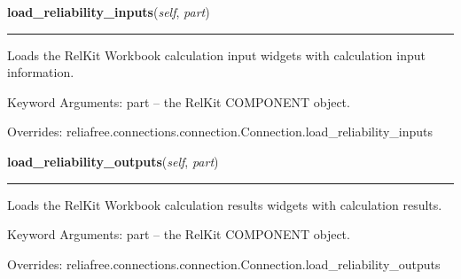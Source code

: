     \vspace{0.5ex}

\hspace{.8\funcindent}\begin{boxedminipage}{\funcwidth}

    \raggedright \textbf{load\_reliability\_inputs}(\textit{self}, \textit{part})

    \vspace{-1.5ex}

    \rule{\textwidth}{0.5\fboxrule}
\setlength{\parskip}{2ex}
    Loads the RelKit Workbook calculation input widgets with calculation
    input information.

    Keyword Arguments: part -- the RelKit COMPONENT object.

\setlength{\parskip}{1ex}
      Overrides: reliafree.connections.connection.Connection.load\_reliability\_inputs

    \end{boxedminipage}

    \vspace{0.5ex}

\hspace{.8\funcindent}\begin{boxedminipage}{\funcwidth}

    \raggedright \textbf{load\_reliability\_outputs}(\textit{self}, \textit{part})

    \vspace{-1.5ex}

    \rule{\textwidth}{0.5\fboxrule}
\setlength{\parskip}{2ex}
    Loads the RelKit Workbook calculation results widgets with 
    calculation results.

    Keyword Arguments: part -- the RelKit COMPONENT object.

\setlength{\parskip}{1ex}
      Overrides: reliafree.connections.connection.Connection.load\_reliability\_outputs

    \end{boxedminipage}

    \label{reliafree:connections:multipin:Multipin:calculate_mil_217_count}

    \vspace{0.5ex}

